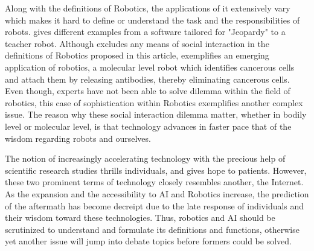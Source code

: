 \documentclass[man]{apa6}
\begin{document}
Along with the definitions of Robotics, the applications of it extensively vary which makes it hard to define or understand the task and the responsibilities of robots.  gives different examples from a software tailored for "Jeopardy" to a teacher robot. Although  excludes any means of social interaction in the definitions of Robotics proposed in this article,  exemplifies an emerging application of robotics, a molecular level robot which identifies cancerous cells and attach them by releasing antibodies, thereby eliminating cancerous cells. Even though, experts have not been able to solve dilemma within the field of robotics, this case of sophistication within Robotics exemplifies another complex issue. The reason why these social interaction dilemma matter, whether in bodily level or molecular level, is that technology advances in faster pace that of the wisdom regarding robots and ourselves.\par
The notion of increasingly accelerating technology with the precious help of scientific research studies thrills individuals, and gives hope to patients. However, these two prominent terms of technology closely resembles another, the Internet. As the expansion and the accessibility to AI and Robotics increase, the prediction of the aftermath has become decreipt due to the late response of individuals and their wisdom toward these technologies. Thus, robotics and AI should be scrutinized to understand and formulate its definitions and functions, otherwise yet another issue will jump into debate topics before formers could be solved.
\clearpage
\end{document}
